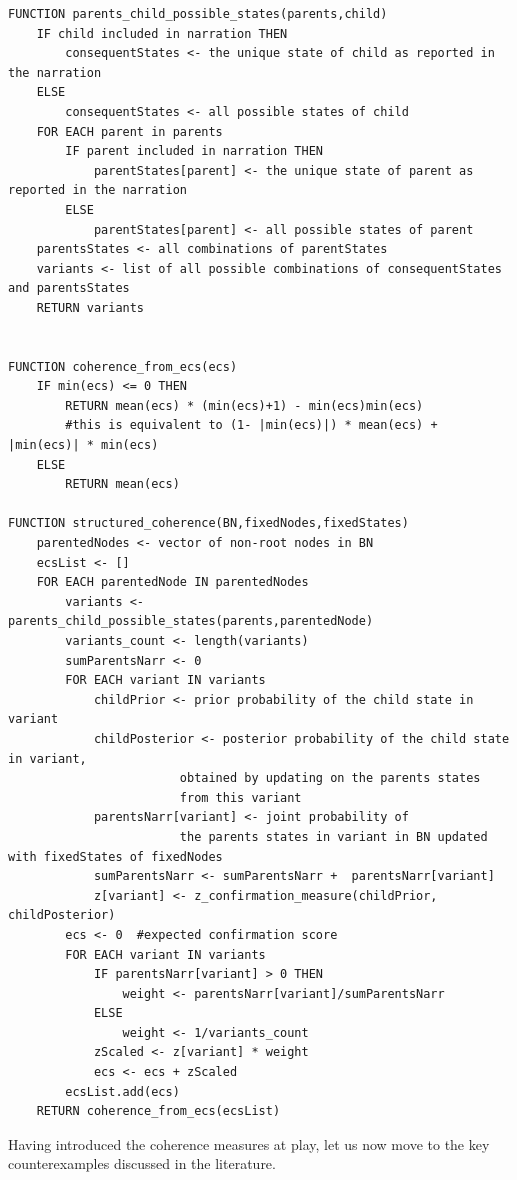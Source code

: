 \documentclass[
  10pt,
]{scrartcl}
\begin{document}
\begin{verbatim}
FUNCTION parents_child_possible_states(parents,child)
    IF child included in narration THEN
        consequentStates <- the unique state of child as reported in the narration
    ELSE
        consequentStates <- all possible states of child
    FOR EACH parent in parents
        IF parent included in narration THEN
            parentStates[parent] <- the unique state of parent as reported in the narration
        ELSE
            parentStates[parent] <- all possible states of parent
    parentsStates <- all combinations of parentStates
    variants <- list of all possible combinations of consequentStates and parentsStates
    RETURN variants


FUNCTION coherence_from_ecs(ecs)
    IF min(ecs) <= 0 THEN
        RETURN mean(ecs) * (min(ecs)+1) - min(ecs)min(ecs)
        #this is equivalent to (1- |min(ecs)|) * mean(ecs) + |min(ecs)| * min(ecs)
    ELSE
        RETURN mean(ecs)

FUNCTION structured_coherence(BN,fixedNodes,fixedStates)
    parentedNodes <- vector of non-root nodes in BN
    ecsList <- []
    FOR EACH parentedNode IN parentedNodes
        variants <- parents_child_possible_states(parents,parentedNode)
        variants_count <- length(variants)
        sumParentsNarr <- 0
        FOR EACH variant IN variants
            childPrior <- prior probability of the child state in variant
            childPosterior <- posterior probability of the child state in variant,
                        obtained by updating on the parents states
                        from this variant
            parentsNarr[variant] <- joint probability of 
                        the parents states in variant in BN updated with fixedStates of fixedNodes
            sumParentsNarr <- sumParentsNarr +  parentsNarr[variant] 
            z[variant] <- z_confirmation_measure(childPrior, childPosterior)
        ecs <- 0  #expected confirmation score
        FOR EACH variant IN variants
            IF parentsNarr[variant] > 0 THEN
                weight <- parentsNarr[variant]/sumParentsNarr
            ELSE
                weight <- 1/variants_count
            zScaled <- z[variant] * weight
            ecs <- ecs + zScaled
        ecsList.add(ecs)
    RETURN coherence_from_ecs(ecsList)
\end{verbatim}

\normalsize

\noindent Having introduced the coherence measures at play, let us now move to the key counterexamples discussed in the literature.
\end{document}
